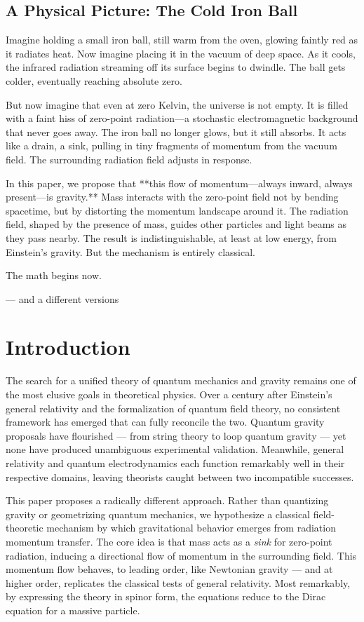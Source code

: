 \documentclass {article}
\begin{document}
\subsection{A Physical Picture: The Cold Iron Ball}

Imagine holding a small iron ball, still warm from the oven, glowing faintly red as it radiates heat. Now imagine placing it in the vacuum of deep space. As it cools, the infrared radiation streaming off its surface begins to dwindle. The ball gets colder, eventually reaching absolute zero.

But now imagine that even at zero Kelvin, the universe is not empty. It is filled with a faint hiss of zero-point radiation—a stochastic electromagnetic background that never goes away. The iron ball no longer glows, but it still absorbs. It acts like a drain, a sink, pulling in tiny fragments of momentum from the vacuum field. The surrounding radiation field adjusts in response.

In this paper, we propose that **this flow of momentum—always inward, always present—is gravity.** Mass interacts with the zero-point field not by bending spacetime, but by distorting the momentum landscape around it. The radiation field, shaped by the presence of mass, guides other particles and light beams as they pass nearby. The result is indistinguishable, at least at low energy, from Einstein's gravity. But the mechanism is entirely classical.

The math begins now.


--- and a different versions

\section{Introduction}

The search for a unified theory of quantum mechanics and gravity remains one of the most elusive goals in theoretical physics. Over a century after Einstein’s general relativity and the formalization of quantum field theory, no consistent framework has emerged that can fully reconcile the two. Quantum gravity proposals have flourished — from string theory to loop quantum gravity — yet none have produced unambiguous experimental validation. Meanwhile, general relativity and quantum electrodynamics each function remarkably well in their respective domains, leaving theorists caught between two incompatible successes.

This paper proposes a radically different approach. Rather than quantizing gravity or geometrizing quantum mechanics, we hypothesize a classical field-theoretic mechanism by which gravitational behavior emerges from radiation momentum transfer. The core idea is that mass acts as a \emph{sink} for zero-point radiation, inducing a directional flow of momentum in the surrounding field. This momentum flow behaves, to leading order, like Newtonian gravity — and at higher order, replicates the classical tests of general relativity. Most remarkably, by expressing the theory in spinor form, the equations reduce to the Dirac equation for a massive particle.
\end{document}
